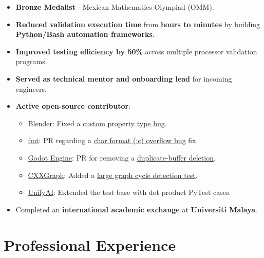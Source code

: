 \documentclass[10.5pt,a4paper]{article}
\begin{document}
\begin{itemize}
  \item \textbf{Bronze Medalist} - Mexican Mathematics Olympiad (OMM). \\
  \item \textbf{Reduced validation execution time} from \textbf{hours to minutes} by building \textbf{Python/Bash automation frameworks}. \\
  \item \textbf{Improved testing efficiency by 50\%} across multiple processor validation programs. \\
  \item \textbf{Served as technical mentor and onboarding lead} for incoming engineers. \\
  \item \textbf{Active open-source contributor}:
  \begin{itemize}
  \item \href{https://www.blender.org/}{Blender}: Fixed a \href{https://projects.blender.org/blender/blender/pulls/161439}{custom property type bug}. \\
  \item \href{https://fmt.dev/}{fmt}: PR regarding a \href{https://github.com/fmtlib/fmt/pull/4840}{char format ({:c}) overflow bug} fix. \\
  \item \href{https://godotengine.org/}{Godot Engine}: PR for removing a \href{https://github.com/godotengine/godot/pull/121253}{duplicate-buffer deletion}. \\
  \item \href{https://github.com/ZigRazor/CXXGraph/}{CXXGraph}: Added a \href{https://github.com/ZigRazor/CXXGraph/pull/606}{large graph cycle detection test}. \\
  \item \href{https://unify.ai/}{UnifyAI}: Extended the test base with dot product PyTest cases. \\
\end{itemize}
  \item Completed an \textbf{international academic exchange} at \textbf{Universiti Malaya}. \\
\end{itemize}

\section*{Professional Experience}
\end{document}
